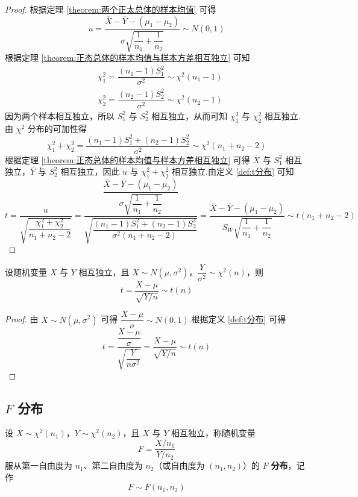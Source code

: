 \begin{proof}
    根据定理 \ref{theorem:两个正太总体的样本均值} 可得
    $$
    u = \dfrac{\overline{X} - \overline{Y} - (\mu_1 - \mu_2)}{\sigma \sqrt{\dfrac{1}{n_1} + \dfrac{1}{n_2}}} \sim N(0,1)
    $$
    根据定理 \ref{theorem:正态总体的样本均值与样本方差相互独立} 可知
    $$
    \begin{aligned}
        & \chi_1^2 = \dfrac{(n_1 - 1) S_1^2}{\sigma^2} \sim \chi^2(n_1 - 1) \\
        & \chi_2^2 = \dfrac{(n_2 - 1) S_2^2}{\sigma^2} \sim \chi^2(n_2 - 1)
    \end{aligned}
    $$
    因为两个样本相互独立，所以 $S_1^2$ 与 $S_2^2$ 相互独立，从而可知 $\chi_1^2$ 与 $\chi_2^2$ 相互独立.由 $\chi^2$ 分布的可加性得
    $$
    \chi_1^2 + \chi_2^2 = \dfrac{(n_1 - 1) S_1^2 + (n_2 - 1) S_2^2}{\sigma^2} \sim \chi^2(n_1 + n_2 - 2)
    $$
    根据定理 \ref{theorem:正态总体的样本均值与样本方差相互独立} 可得 $\overline{X}$ 与 $S_1^2$ 相互独立，$\overline{Y}$ 与 $S_2^2$ 相互独立，因此 $u$ 与 $\chi_1^2 + \chi_2^2$ 相互独立.由定义 \ref{def:t分布} 可知
    $$
    t = \dfrac{u}{\sqrt{\dfrac{\chi_1^2 + \chi_2^2}{n_1 + n_2 - 2}}} = \dfrac{\dfrac{\overline{X} - \overline{Y} - (\mu_1 - \mu_2)}{\sigma \sqrt{\dfrac{1}{n_1} + \dfrac{1}{n_2}}}}{\sqrt{\dfrac{(n_1 - 1) S_1^2 + (n_2 - 1) S_2^2}{\sigma^2 (n_1 + n_2 - 2)}}} = \dfrac{\overline{X} - \overline{Y} - (\mu_1 - \mu_2)}{S_W \sqrt{\dfrac{1}{n_1} + \dfrac{1}{n_2}}} \sim t(n_1 + n_2 - 2)
    $$
\end{proof}

\begin{conclusion}
    设随机变量 $X$ 与 $Y$ 相互独立，且 $X \sim N(\mu, \sigma^2)$，$\dfrac{Y}{\sigma^2} \sim \chi^2(n)$，则
    $$
    t = \dfrac{X - \mu}{\sqrt{Y / n}} \sim t(n)
    $$
\end{conclusion}

\begin{proof}
    由 $X \sim N(\mu, \sigma^2)$ 可得 $\dfrac{X - \mu}{\sigma} \sim N(0,1)$.根据定义 \ref{def:t分布} 可得
    $$
    t = \dfrac{\dfrac{X - \mu}{\sigma}}{\sqrt{\dfrac{Y}{n \sigma^2}}} = \dfrac{X - \mu}{\sqrt{Y / n}} \sim t(n)
    $$
\end{proof}

\subsection{\texorpdfstring{$F$}{} 分布}

\begin{definition} \label{def:F分布}
    设 $X \sim \chi^2(n_1)$，$Y \sim \chi^2(n_2)$，且 $X$ 与 $Y$ 相互独立，称随机变量
    $$
    F = \dfrac{X / n_1}{Y / n_2}
    $$
    服从第一自由度为 $n_1$、第二自由度为 $n_2$（或自由度为 $(n_1,n_2)$）的 $F$ \textbf{分布}，记作
    $$
    F \sim F(n_1, n_2)
    $$
\end{definition}

